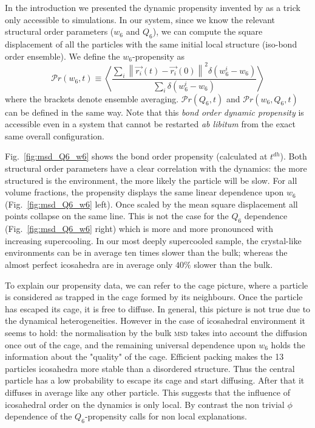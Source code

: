 \documentclass{revtex4-1}
\begin{document}
In the introduction we presented the dynamic propensity invented by \citet{Widmer-Cooper2005} as a trick only accessible to simulations. In our system, since we know the relevant structural order parameters ($w_6$ and $Q_6$), we can compute the square displacement of all the particles with the same initial local structure (iso-bond order ensemble). We define the $w_6$-propensity as
\begin{equation}
	\mathcal{P}r(w_6, t) \equiv \left\langle \frac{
		\sum\limits_i{
			\left\|\vec{r_i}(t)-\vec{r_i}(0)\right\|^2 \delta(w_6^i-w_6)
			}
	}{
		\sum\limits_i{\delta(w_6^i-w_6)}
	}\right\rangle 
	\label{eq:bo_propensity}
\end{equation}
where the brackets denote ensemble averaging. $\mathcal{P}r(Q_6, t)$ and $\mathcal{P}r(w_6, Q_6, t)$ can be defined in the same way. Note that this \emph{bond order dynamic propensity} is accessible even in a system that cannot be restarted \emph{ab libitum} from the exact same overall configuration.

Fig.~\ref{fig:msd_Q6_w6} shows the bond order propensity (calculated at $t^{dh}$). Both structural order parameters have a clear correlation with the dynamics: the more structured is the environment, the more likely the particle will be slow. For all volume fractions, the propensity displays the same linear dependence upon $w_6$ (Fig.~\ref{fig:msd_Q6_w6} left). Once scaled by the mean square displacement all points collapse on the same line. This is not the case for the $Q_6$ dependence (Fig.~\ref{fig:msd_Q6_w6} right) which is more and more pronounced with increasing supercooling. In our most deeply supercooled sample, the crystal-like environments can be in average ten times slower than the bulk; whereas the almost perfect icosahedra are in average only $40\%$ slower than the bulk.

To explain our propensity data, we can refer to the cage picture, where a particle is considered as trapped in the cage formed by its neighbours. Once the particle has escaped its cage, it is free to diffuse. In general, this picture is not true due to the dynamical heterogeneities. However in the case of icosahedral environment it seems to hold: the normalisation by the bulk \textsc{msd} takes into account the diffusion once out of the cage, and the remaining universal dependence upon $w_6$ holds the information about the "quality" of the cage. Efficient packing makes the 13 particles icosahedra more stable than a disordered structure. Thus the central particle has a low probability to escape its cage and start diffusing. After that it diffuses in average like any other particle. This suggests that the influence of icosahedral order on the dynamics is only local. By contrast the non trivial $\phi$ dependence of the $Q_6$-propensity calls for non local explanations.
\end{document}
